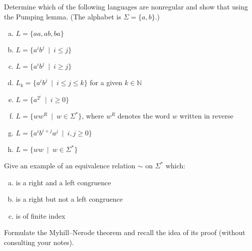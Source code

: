 \documentclass[a4paper,12pt]{amsart}
\begin{document}
    
\medskip\begin{problem}
    
    Determine which of the following languages are nonregular and show that using the Pumping lemma. (The alphabet is $\Sigma=\{a,b\}$.)
    
    \medskip
      
    \begin{enumerate}[(a)]\setlength\itemsep{12pt}
        \item $L=\{aa, ab, ba\}$
        \item $L=\{a^ib^j\ \mid\ i\leq j\}$
        \item $L=\{a^ib^j\ \mid\ i\geq j\}$
        \item $L_k=\{a^ib^j\ \mid\ i\leq j\leq k\}$ for a given $k\in\mathbb N$
        \item $L=\{a^{2^i}\ \mid\ i\geq 0\}$
        \item $L=\{ww^R\ \mid \ w\in\Sigma^*\}$, where $w^R$ denotes the word $w$ written in reverse
        \item $L=\{a^ib^{i+j}a^j\ \mid\ i,j\geq 0\}$
        \item $L=\{ww\ \mid \ w\in\Sigma^*\}$
    \end{enumerate}
      
\end{problem}


\medskip\begin{problem}

    Give an example of an equivalence relation $\sim$ on $\Sigma^*$ which:

    \medskip
    
    \begin{enumerate}[(a)]\setlength\itemsep{12pt}
        \item is a right and a left congruence
        \item is a right but not a left congruence
        \item is of finite index
    \end{enumerate}

\end{problem}


\medskip\begin{problem}
    
    Formulate the Myhill--Nerode theorem and recall the idea of its proof (without consulting your notes).

\end{problem}
\end{document}
